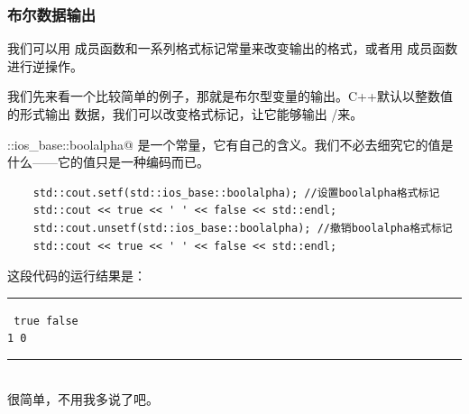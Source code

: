 \subsubsection*{布尔数据输出}
我们可以用 \lstinline@setf@ 成员函数和一系列格式标记常量来改变输出的格式，或者用 \lstinline@unsetf@ 成员函数进行逆操作。\par
我们先来看一个比较简单的例子，那就是布尔型变量的输出。C++默认以整数值的形式输出 \lstinline@bool@ 数据，我们可以改变格式标记，让它能够输出 \lstinline@true@/\lstinline@false@ 来。\par
\lstinline@std::ios_base::boolalpha@ 是一个常量，它有自己的含义。我们不必去细究它的值是什么——它的值只是一种编码而已。
\begin{lstlisting}
    std::cout.setf(std::ios_base::boolalpha); //设置boolalpha格式标记
    std::cout << true << ' ' << false << std::endl;
    std::cout.unsetf(std::ios_base::boolalpha); //撤销boolalpha格式标记
    std::cout << true << ' ' << false << std::endl;
\end{lstlisting}
这段代码的运行结果是：\\\noindent\rule{\linewidth}{.2pt}\texttt{
true false\\
1 0
}\\\noindent\rule{\linewidth}{.2pt}\\
很简单，不用我多说了吧。\par
